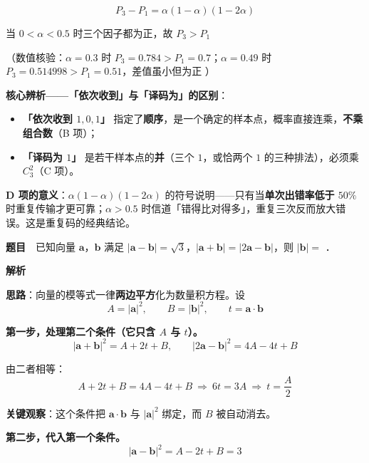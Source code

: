 \[P_3-P_1=\alpha(1-\alpha)(1-2\alpha)\]

当 $0<\alpha<0.5$ 时三个因子都为正，故 $P_3>P_1$ 

（数值核验：$\alpha=0.3$ 时 $P_3=0.784>P_1=0.7$；$\alpha=0.49$ 时 $P_3=0.514998>P_1=0.51$，差值虽小但为正 ）

\par\medskip


\begin{gktip}
\textbf{核心辨析——「依次收到」与「译码为」的区别}：
\begin{itemize}
\item \textbf{「依次收到 $1,0,1$」} 指定了\textbf{顺序}，是一个确定的样本点，概率直接连乘，\textbf{不乘组合数}（B 项）；
\item \textbf{「译码为 $1$」} 是若干样本点的\textbf{并}（三个 $1$，或恰两个 $1$ 的三种排法），必须乘 $C_3^{2}$（C 项）。
\end{itemize}

\textbf{D 项的意义}：$\alpha(1-\alpha)(1-2\alpha)$ 的符号说明——只有当\textbf{单次出错率低于 $50\%$} 时重复传输才更可靠；$\alpha>0.5$ 时信道「错得比对得多」，重复三次反而放大错误。这是重复码的经典结论。
\end{gktip}

\par\medskip



\textbf{题目}　已知向量 $\boldsymbol a$，$\boldsymbol b$ 满足 $|\boldsymbol a-\boldsymbol b|=\sqrt3$，$|\boldsymbol a+\boldsymbol b|=|2\boldsymbol a-\boldsymbol b|$，则 $|\boldsymbol b|=$ \gkblank{}．

\textbf{解析}

\textbf{思路}：向量的模等式一律\textbf{两边平方}化为数量积方程。设
\[A=|\boldsymbol a|^{2},\qquad B=|\boldsymbol b|^{2},\qquad t=\boldsymbol a\cdot\boldsymbol b\]

\textbf{第一步，处理第二个条件（它只含 $A$ 与 $t$）。}
\[|\boldsymbol a+\boldsymbol b|^{2}=A+2t+B,\qquad |2\boldsymbol a-\boldsymbol b|^{2}=4A-4t+B\]

由二者相等：
\[A+2t+B=4A-4t+B\ \Longrightarrow\ 6t=3A\ \Longrightarrow\ t=\frac A2\]

\textbf{关键观察}：这个条件把 $\boldsymbol a\cdot\boldsymbol b$ 与 $|\boldsymbol a|^{2}$ 绑定，而 $B$ 被自动消去。

\textbf{第二步，代入第一个条件。}
\[|\boldsymbol a-\boldsymbol b|^{2}=A-2t+B=3\]

